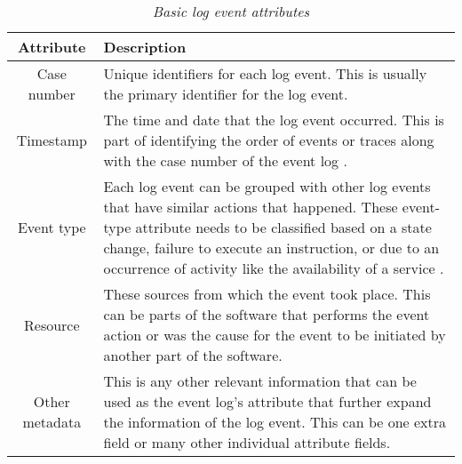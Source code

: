 \begin{table}[!htb]
	\centering
	\caption[Basic log event attributes]
	{\textit{Basic log event attributes \cite{Bekeneva2020}}}
	\label{tbl:ch1_logBasicAttributes}
	\begin{tabularx}{\textwidth}{|c|X|}
		\hline \textbf{Attribute} & \textbf{Description} \\
		\hline Case number & Unique identifiers for each log event. This is usually the primary identifier for the log event. \\
		\hline Timestamp & The time and date that the log event occurred. This is part of identifying the order of events or traces along with the case number of the event log \cite{Kherbouche2017}. \\
		\hline Event type & Each log event can be grouped with other log events that have similar actions that happened. These event-type attribute needs to be classified based on a state change, failure to execute an instruction, or due to an occurrence of activity like the availability of a service \cite{Fedaghi2010}. \\
		\hline Resource & These sources from which the event took place. This can be parts of the software that performs the event action or was the cause for the event to be initiated by another part of the software. \\
		\hline Other metadata & This is any other relevant information that can be used as the event log's attribute that further expand the information of the log event. This can be one extra field or many other individual attribute fields.\\
		\hline
	\end{tabularx}
\end{table}


